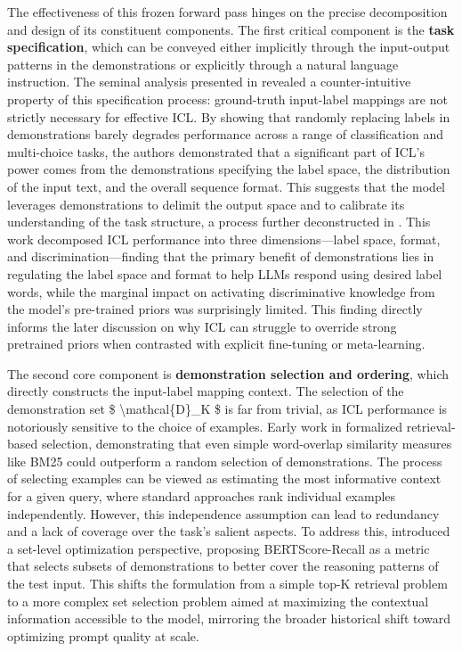 \documentclass[11pt]{article}
\begin{document}
The effectiveness of this frozen forward pass hinges on the precise decomposition and design of its constituent components. The first critical component is the \textbf{task specification}, which can be conveyed either implicitly through the input-output patterns in the demonstrations or explicitly through a natural language instruction. The seminal analysis presented in \cite{ref18} revealed a counter-intuitive property of this specification process: ground-truth input-label mappings are not strictly necessary for effective ICL. By showing that randomly replacing labels in demonstrations barely degrades performance across a range of classification and multi-choice tasks, the authors demonstrated that a significant part of ICL's power comes from the demonstrations specifying the label space, the distribution of the input text, and the overall sequence format. This suggests that the model leverages demonstrations to delimit the output space and to calibrate its understanding of the task structure, a process further deconstructed in \cite{ref7}. This work decomposed ICL performance into three dimensions---label space, format, and discrimination---finding that the primary benefit of demonstrations lies in regulating the label space and format to help LLMs respond using desired label words, while the marginal impact on activating discriminative knowledge from the model's pre-trained priors was surprisingly limited. This finding directly informs the later discussion on why ICL can struggle to override strong pretrained priors when contrasted with explicit fine-tuning or meta-learning.

The second core component is \textbf{demonstration selection and ordering}, which directly constructs the input-label mapping context. The selection of the demonstration set \$ \textbackslash mathcal\{D\}\_K \$ is far from trivial, as ICL performance is notoriously sensitive to the choice of examples. Early work in \cite{ref19} formalized retrieval-based selection, demonstrating that even simple word-overlap similarity measures like BM25 could outperform a random selection of demonstrations. The process of selecting examples can be viewed as estimating the most informative context for a given query, where standard approaches rank individual examples independently. However, this independence assumption can lead to redundancy and a lack of coverage over the task's salient aspects. To address this, \cite{ref20} introduced a set-level optimization perspective, proposing BERTScore-Recall as a metric that selects subsets of demonstrations to better cover the reasoning patterns of the test input. This shifts the formulation from a simple top-K retrieval problem to a more complex set selection problem aimed at maximizing the contextual information accessible to the model, mirroring the broader historical shift toward optimizing prompt quality at scale.
\end{document}
